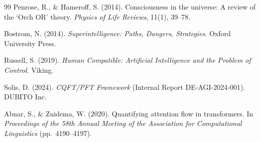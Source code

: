\documentclass[12pt,a4paper]{article}
\theoremstyle{plain}
\theoremstyle{definition}
\begin{document}
\begin{thebibliography}{99}
Penrose, R., \& Hameroff, S. (2014).
Consciousness in the universe: A review of the `Orch OR' theory.
\textit{Physics of Life Reviews}, 11(1), 39--78.

Bostrom, N. (2014).
\textit{Superintelligence: Paths, Dangers, Strategies}.
Oxford University Press.

Russell, S. (2019).
\textit{Human Compatible: Artificial Intelligence and the Problem of
Control}.
Viking.

Solis, D. (2024).
\textit{CQFT/PFT Framework} (Internal Report DE-AGI-2024-001).
DUBITO Inc.

Abnar, S., \& Zuidema, W. (2020).
Quantifying attention flow in transformers.
In \textit{Proceedings of the 58th Annual Meeting of the Association for
Computational Linguistics} (pp.~4190--4197).

\end{thebibliography}
\end{document}
